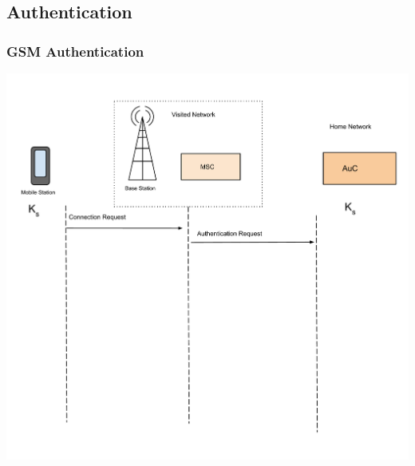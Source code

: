 \documentclass{beamer}
\begin{document}
\subsection{Authentication}

\begin{frame}
  \frametitle{GSM Authentication}
  \begin{center}
  \includegraphics[scale =.25]{Images/GSMAuthentication1.pdf}

  \end{center} 
\end{frame}
\end{document}
